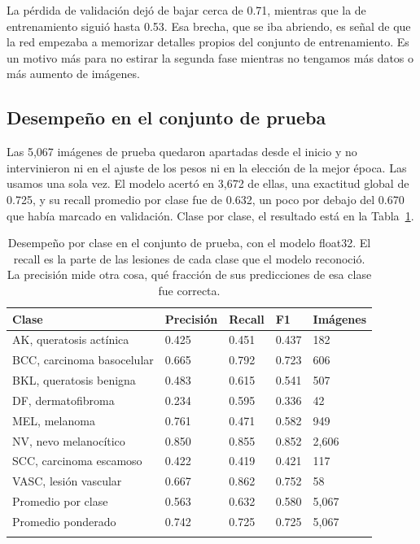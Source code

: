 \documentclass[pdflatex,sn-mathphys-num]{sn-jnl}%
\theoremstyle{thmstyleone}%
\theoremstyle{thmstyletwo}%
\theoremstyle{thmstylethree}%
\begin{document}
La pérdida de validación dejó de bajar cerca de 0.71, mientras que la de entrenamiento siguió hasta 0.53. Esa brecha, que se iba abriendo, es señal de que la red empezaba a memorizar detalles propios del conjunto de entrenamiento. Es un motivo más para no estirar la segunda fase mientras no tengamos más datos o más aumento de imágenes.

\subsection{Desempeño en el conjunto de prueba}\label{subsec3}

Las 5,067 imágenes de prueba quedaron apartadas desde el inicio y no intervinieron ni en el ajuste de los pesos ni en la elección de la mejor época. Las usamos una sola vez. El modelo acertó en 3,672 de ellas, una exactitud global de 0.725, y su recall promedio por clase fue de 0.632, un poco por debajo del 0.670 que había marcado en validación. Clase por clase, el resultado está en la Tabla~\ref{tab1}.

\begin{table}[h]
\caption{Desempeño por clase en el conjunto de prueba, con el modelo float32. El recall es la parte de las lesiones de cada clase que el modelo reconoció. La precisión mide otra cosa, qué fracción de sus predicciones de esa clase fue correcta.}\label{tab1}%
\begin{tabular}{@{}lllll@{}}
\toprule
Clase & Precisión & Recall & F1 & Imágenes\\
\midrule
AK, queratosis actínica      & 0.425 & 0.451 & 0.437 & 182 \\
BCC, carcinoma basocelular   & 0.665 & 0.792 & 0.723 & 606 \\
BKL, queratosis benigna      & 0.483 & 0.615 & 0.541 & 507 \\
DF, dermatofibroma           & 0.234 & 0.595 & 0.336 & 42 \\
MEL, melanoma                & 0.761 & 0.471 & 0.582 & 949 \\
NV, nevo melanocítico        & 0.850 & 0.855 & 0.852 & 2,606 \\
SCC, carcinoma escamoso      & 0.422 & 0.419 & 0.421 & 117 \\
VASC, lesión vascular        & 0.667 & 0.862 & 0.752 & 58 \\
\midrule
Promedio por clase           & 0.563 & 0.632 & 0.580 & 5,067 \\
Promedio ponderado           & 0.742 & 0.725 & 0.725 & 5,067 \\
\botrule
\end{tabular}
\end{table}
\end{document}
